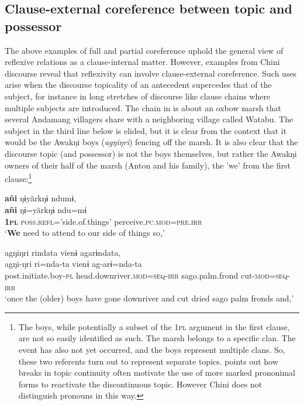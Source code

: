 \documentclass[output=paper]{langscibook}
\begin{document}
\subsection{{Clause-external} {coreference} {between} {topic} {and} {possessor}}\label{sec:brooks:3.3}

The above examples of full and partial coreference uphold the general view of reflexive relations as a clause-internal matter. However, examples from Chini discourse reveal that reflexivity can involve clause-external coreference. Such uses arise when the discourse topicality of an antecedent supercedes that of the subject, for instance in long stretches of discourse like clause chains where multiple subjects are introduced. The chain in  is about an oxbow marsh that several Andamang villagers share with a neighboring village called Watabu. The subject in the third line below is elided, but it is clear from the context that it would be the Awakŋi boys (\textit{agŋiŋri}) fencing off the marsh. It is also clear that the discourse topic (and possessor) is not the boys themselves, but rather the Awakŋi owners of their half of the marsh (Anton and his family), the 'we' from the first clause:\footnote{The boys, while potentially a subset of the 1\textsc{pl} argument in the first clause, are not so easily identified as such. The marsh belongs to a specific clan. The event has also not yet occurred, and the boys represent multiple clans. So, these two referents turn out to represent separate topics. \citet{Comrie1998} points out how breaks in topic continuity often motivate the use of more marked prononimal forms to reactivate the discontinuous topic. However Chini does not distinguish pronouns in this way.}

\ea\label{ex:brooks:21}
\glll \textbf{añi}  ŋɨyãrkŋɨ ndumɨ,  \\
\textbf{añi} ŋɨ=yãrkŋɨ ndu=mɨ\\
\textbf{\textsc{1pl} } \textsc{poss.refl}=’side.of.things’  perceive.\textsc{pc.mod=pre.irr}\\
\glt `\textbf{We} need to attend to our side of things so,'

\glll agŋiŋri rindata vienɨ agarɨndata, \\
agŋi-ŋri ri=nda-ta vienɨ ag-arɨ=nda-ta\\
post.initiate.boy-\textsc{pl}  head.downriver.\textsc{mod=seq-irr}  sago.palm.frond  cut-\textsc{mod=seq-irr}\\
\glt ‘once the (older) boys have gone downriver and cut dried sago palm fronds and,'
\end{document}
